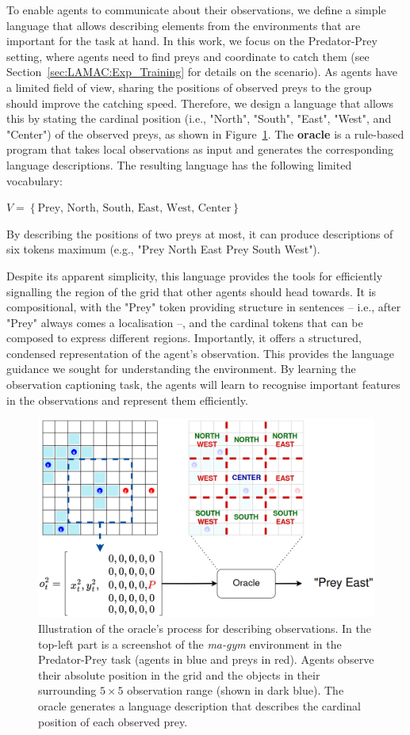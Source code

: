 To enable agents to communicate about their observations, we define a simple language that allows describing elements from the environments that are important for the task at hand. In this work, we focus on the Predator-Prey setting, where agents need to find preys and coordinate to catch them (see Section~\ref{sec:LAMAC:Exp_Training} for details on the scenario). As agents have a limited field of view, sharing the positions of observed preys to the group should improve the catching speed. Therefore, we design a language that allows this by stating the cardinal position (i.e., "North", "South", "East", "West", and "Center") of the observed preys, as shown in Figure~\ref{fig:LAMAC:oracle}. The \textbf{oracle} is a rule-based program that takes local observations as input and generates the corresponding language descriptions. The resulting language has the following limited vocabulary:
\begin{center}
    $V=\left\{\text{Prey, North, South, East, West, Center}\right\}$
\end{center}
By describing the positions of two preys at most, it can produce descriptions of six tokens maximum (e.g., "Prey North East Prey South West"). 

Despite its apparent simplicity, this language provides the tools for efficiently signalling the region of the grid that other agents should head towards. It is compositional, with the "Prey" token providing structure in sentences -- i.e., after "Prey" always comes a localisation --, and the cardinal tokens that can be composed to express different regions. Importantly, it offers a structured, condensed representation of the agent's observation. This provides the language guidance we sought for understanding the environment. By learning the observation captioning task, the agents will learn to recognise important features in the observations and represent them efficiently.  

\begin{figure}
    \centering
    \includegraphics[width=0.8\linewidth]{Figures/LAMAC/parsing.png}
    \caption{Illustration of the oracle's process for describing observations. In the top-left part is a screenshot of the \textit{ma-gym} environment in the Predator-Prey task (agents in blue and preys in red). Agents observe their absolute position in the grid and the objects in their surrounding $5\times 5$ observation range (shown in dark blue). The oracle generates a language description that describes the cardinal position of each observed prey.}
    \label{fig:LAMAC:oracle}
\end{figure}




